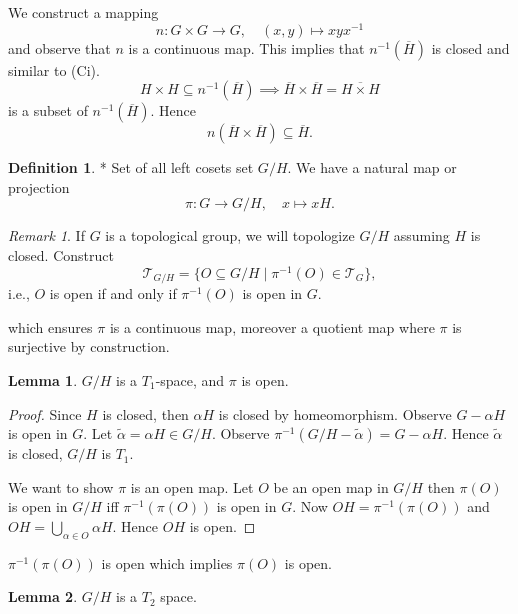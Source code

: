 \documentclass[11pt]{article}
\theoremstyle{definition}
\newtheorem{definition}{Definition}[section]
\newtheorem{lemma}{Lemma}[section]
\theoremstyle{remark}
\newtheorem{remark}{Remark}[section]
\begin{document}
We construct a mapping
\[
n \colon G \times G \to G, \quad (x, y) \mapsto x y x^{-1}
\]
and observe that $n$ is a continuous map. This implies that $n^{-1}(\overline{H})$ is closed and similar to (Ci).
\[
H \times H \subseteq n^{-1}(\overline{H}) \implies \overline{H} \times \overline{H} = \overline{H \times H}
\]
is a subset of $n^{-1}(\overline{H})$. Hence
\[
n(\overline{H} \times \overline{H}) \subseteq \overline{H}.
\]

\begin{definition}\label{def:left_cosets}
* Set of all left cosets set $G/H$. We have a natural map or projection
\[
\pi \colon G \to G/H, \quad x \mapsto xH.
\]
\end{definition}

\begin{remark}\label{rem:topology_on_quotient}
If $G$ is a topological group, we will topologize $G/H$ assuming $H$ is closed. Construct
\[
\mathcal{T}_{G/H} = \{ O \subseteq G/H \mid \pi^{-1}(O) \in \mathcal{T}_G \},
\]
i.e., $O$ is open if and only if $\pi^{-1}(O)$ is open in $G$.
\end{remark}

which ensures $\pi$ is a continuous map, moreover a quotient map where $\pi$ is surjective by construction.

\begin{lemma}\label{lem:quotient_space}
$G/H$ is a $T_1$-space, and $\pi$ is open.
\end{lemma}

\begin{proof}
Since $H$ is closed, then $\alpha H$ is closed by homeomorphism. Observe $G - \alpha H$ is open in $G$.
Let $\tilde{\alpha} = \alpha H \in G/H$. Observe
$\pi^{-1}(G/H - \tilde{\alpha}) = G - \alpha H$.
Hence $\tilde{\alpha}$ is closed, $G/H$ is $T_1$.

We want to show $\pi$ is an open map.
Let $O$ be an open map in $G/H$ then
$\pi(O)$ is open in $G/H$ iff $\pi^{-1}(\pi(O))$ is open in $G$.
Now $OH = \pi^{-1}(\pi(O))$ and
$OH = \bigcup_{\alpha \in O} \alpha H$.
Hence $OH$ is open.
\end{proof}

$\pi^{-1}(\pi(O))$ is open which implies $\pi(O)$ is open.

\begin{lemma}\label{lem:G/H_T2}
$G/H$ is a $T_2$ space.
\end{lemma}
\end{document}
